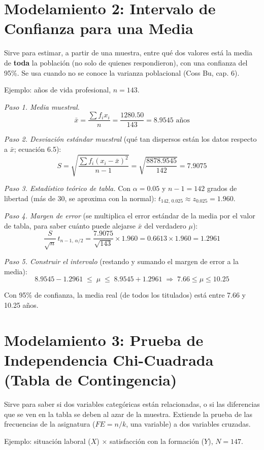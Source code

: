 \documentclass[12pt]{article}
\begin{document}
\section*{Modelamiento 2: Intervalo de Confianza para una Media}

Sirve para estimar, a partir de una muestra, entre qué dos valores está la media de \textbf{toda} la población (no solo de quienes respondieron), con una confianza del 95\%. Se usa cuando no se conoce la varianza poblacional (Coss Bu, cap. 6).

Ejemplo: años de vida profesional, $n=143$.

\textit{Paso 1. Media muestral.}
\[
\bar{x} = \frac{\sum f_i x_i}{n} = \frac{1280.50}{143} = 8.9545 \text{ años}
\]

\textit{Paso 2. Desviación estándar muestral} (qué tan dispersos están los datos respecto a $\bar{x}$; ecuación 6.5):
\[
S = \sqrt{\frac{\sum f_i (x_i-\bar{x})^2}{n-1}} = \sqrt{\frac{8878.9545}{142}} = 7.9075
\]

\textit{Paso 3. Estadístico teórico de tabla.} Con $\alpha=0.05$ y $n-1=142$ grados de libertad (más de 30, se aproxima con la normal): $t_{142,\,0.025} \approx z_{0.025} = 1.960$.

\textit{Paso 4. Margen de error} (se multiplica el error estándar de la media por el valor de tabla, para saber cuánto puede alejarse $\bar{x}$ del verdadero $\mu$):
\[
\frac{S}{\sqrt{n}}\,t_{n-1,\,\alpha/2} = \frac{7.9075}{\sqrt{143}}\times 1.960 = 0.6613 \times 1.960 = 1.2961
\]

\textit{Paso 5. Construir el intervalo} (restando y sumando el margen de error a la media):
\[
8.9545 - 1.2961 \;\le\; \mu \;\le\; 8.9545 + 1.2961 \;\Longrightarrow\; 7.66 \le \mu \le 10.25
\]

Con 95\% de confianza, la media real (de todos los titulados) está entre 7.66 y 10.25 años.

\section*{Modelamiento 3: Prueba de Independencia Chi-Cuadrada (Tabla de Contingencia)}

Sirve para saber si dos variables categóricas están relacionadas, o si las diferencias que se ven en la tabla se deben al azar de la muestra. Extiende la prueba de las frecuencias de la asignatura ($FE=n/k$, una variable) a dos variables cruzadas.

Ejemplo: situación laboral ($X$) $\times$ satisfacción con la formación ($Y$), $N=147$.
\end{document}
